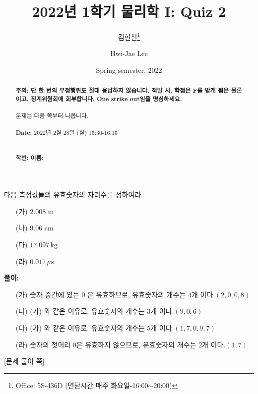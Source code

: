 \documentclass[floatfix,nofootinbib,superscriptaddress,fleqn,preprint]{revtex4-2}
\begin{document}
\title{\Large 2022년 1학기 물리학 I: Quiz 2}
\author{김현철\footnote{Office: 5S-436D (면담시간 매주
    화요일-16:00$\sim$20:00)}} 
\author{Hwi-Jae Lee} 
\date{Spring semester, 2022}

\vspace{1.cm}
\begin{abstract}
\noindent \textbf{ {\color{red}주의}: \color{blue} 단 한 번의 부정행위도 절대
  용납하지 않습니다. 적발 시, 학점은 F를 받게 됨은 물론이고,
  징계위원회에 회부합니다. One strike out임을 명심하세요.}\\
\\
문제는 다음 쪽부터 나옵니다.  \\ \\
{\bf Date:} 2022년 2월 28일 (월) 15:30-16:15 
\\ \\ \\
{\bf 학번:} \hspace{4cm}
{\bf 이름:} 

\end{abstract}
\maketitle
\newpage 
{} 다음 측정값들의 유효숫자의 자리수를 정하여라.
\begin{itemize}
\item[(가)] $2.008$ m
\item[(나)] $9.06$ cm
\item[(다)] $17.097\,\mathrm{kg}$ 
\item[(라)] $0.017\,\mu \mathrm{s}$  
\end{itemize}

\noindent \textbf{풀이:}
\begin{itemize}
  \item[(가)] 숫자 중간에 있는 $0$ 은 유효하므로, 유효숫자의 개수는 4개 이다.$(2,0,0,8)$
  \item[(나)] (가) 와 같은 이유로, 유효숫자의 개수는 3개 이다.$(9,0,6)$
  \item[(다)] (가) 와 같은 이유로, 유효숫자의 개수는 5개 이다.$(1,7,0,9,7)$
  \item[(라)] 숫자의 첫머리 0은 유효하지 않으므로, 유효숫자의 개수는 2개 이다.$(1,7)$
\end{itemize}
\newpage

{\color{gray} [문제 풀이 쪽]}
\end{document}
